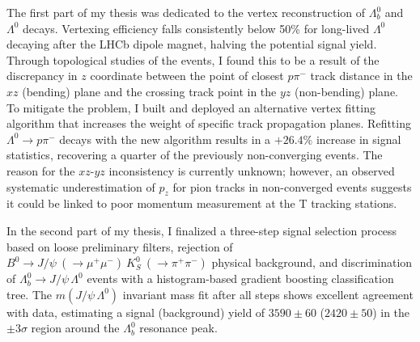\documentclass[12pt,a4paper]{book}
\newcommand{\demonstratorshort}{$\Lambda_b^0 \rightarrow J/\psi\,\Lambda^0$\xspace}
\newcommand{\physbkgfull}{$B^0 \rightarrow J/\psi~(\rightarrow \mu^+ \mu^-)~K^0_S~(\rightarrow \pi^+\pi^-)$\xspace}
\newcommand{\lz}{$\Lambda^0$\xspace}
\newcommand{\lbz}{$\Lambda_b^0$\xspace}
\newcommand{\lambdadecay}{$\Lambda^0 \rightarrow p\pi^-$\xspace}
\begin{document}
The first part of my thesis was dedicated to the vertex reconstruction of \lbz and \lz decays.
Vertexing efficiency falls consistently below 50\% for long-lived \lz decaying after the LHCb dipole magnet, halving the potential signal yield.
Through topological studies of the events, I found this to be a result of the discrepancy in $z$ coordinate between the point of closest $p\pi^-$ track distance in the $xz$ (bending) plane and the crossing track point in the $yz$ (non-bending) plane.
To mitigate the problem, I built and deployed an alternative vertex fitting algorithm that increases the weight of specific track propagation planes.
Refitting \lambdadecay decays with the new algorithm results in a $+26.4\%$ increase in signal statistics, recovering a quarter of the previously non-converging events.
The reason for the $xz$-$yz$ inconsistency is currently unknown;
however, an observed systematic underestimation of $p_z$ for pion tracks in non-converged events suggests it could be linked to poor momentum measurement at the T tracking stations.

In the second part of my thesis, I finalized a three-step signal selection process based on loose preliminary filters, rejection of \physbkgfull physical background, and discrimination of \demonstratorshort events with a histogram-based gradient boosting classification tree.
The $m(J/\psi\,\Lambda^0)$ invariant mass fit after all steps shows excellent agreement with data, estimating a signal (background) yield of $3590 \pm 60$ ($2420 \pm 50$) in the $\pm3\sigma$ region around the \lbz resonance peak.
\end{document}
